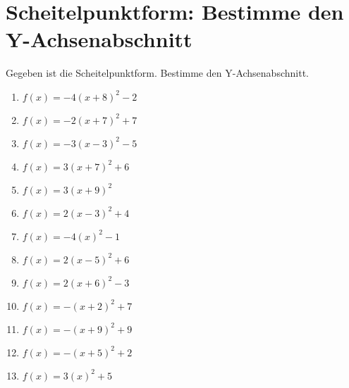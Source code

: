 \documentclass{article}%
\begin{document}
\section{Scheitelpunktform: Bestimme den Y{-}Achsenabschnitt}%
\label{sec:ScheitelpunktformBestimmedenY{-}Achsenabschnitt}%
Gegeben ist die Scheitelpunktform. Bestimme den Y{-}Achsenabschnitt.%
\begin{enumerate}[label=\alph*)]%
\item%
\newline\vspace{0.5cm} $f(x)=-4(x+8)^2 -2$%
\item%
\newline\vspace{0.5cm} $f(x)=-2(x+7)^2 +7$%
\item%
\newline\vspace{0.5cm} $f(x)=-3(x-3)^2 -5$%
\item%
\newline\vspace{0.5cm} $f(x)=3(x+7)^2 +6$%
\item%
\newline\vspace{0.5cm} $f(x)=3(x+9)^2$%
\item%
\newline\vspace{0.5cm} $f(x)=2(x-3)^2 +4$%
\item%
\newline\vspace{0.5cm} $f(x)=-4(x)^2 -1$%
\item%
\newline\vspace{0.5cm} $f(x)=2(x-5)^2 +6$%
\item%
\newline\vspace{0.5cm} $f(x)=2(x+6)^2 -3$%
\item%
\newline\vspace{0.5cm} $f(x)=-(x+2)^2 +7$%
\item%
\newline\vspace{0.5cm} $f(x)=-(x+9)^2 +9$%
\item%
\newline\vspace{0.5cm} $f(x)=-(x+5)^2 +2$%
\item%
\newline\vspace{0.5cm} $f(x)=3(x)^2 +5$%

\end{enumerate}
\end{document}
